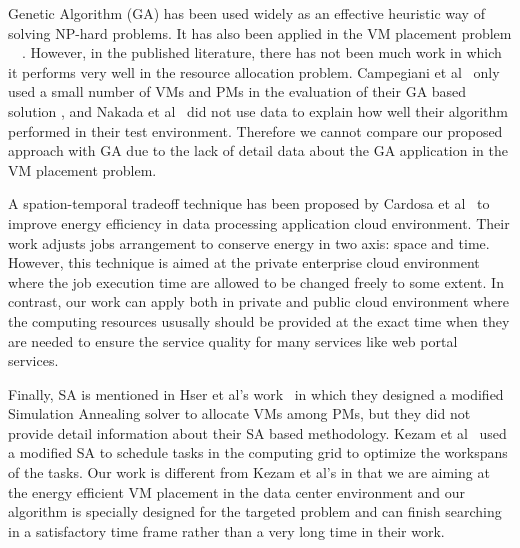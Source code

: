 \documentclass[10pt, conference, compsocconf]{IEEEtran}
\begin{document}
Genetic Algorithm (GA) has been used widely as an effective heuristic way of
solving NP-hard problems. It has also been applied in the VM placement problem
~\cite{nakada09}~\cite{campegiani09}.
However, in the published literature, there has not been much work in which it
performs very well in the resource allocation problem. Campegiani et
al~\cite{campegiani09} only used a small number of VMs and PMs in the evaluation
of their GA based solution , and Nakada et al~\cite{nakada09} did not use data to explain how well their
algorithm performed in their test environment. Therefore we cannot compare our proposed approach
with GA due to the lack of detail data about the GA application in the VM
placement problem.

A spation-temporal tradeoff technique has been proposed by Cardosa et
al~\cite{cardosa11} to improve energy efficiency in data processing application
cloud environment.
Their work adjusts jobs arrangement to conserve energy in two axis: space and
time. However, this technique is aimed at the private enterprise cloud
environment where the job execution time are allowed to be changed freely to
some extent.
In contrast, our work can apply both in private and public cloud environment
where the computing resources ususally should be provided at the exact time when
they are needed to ensure the service quality for many services like web portal
services.

Finally, SA is mentioned in Hser et al's work~\cite{hyser07} in which they designed a modified
Simulation Annealing solver to allocate VMs among PMs, but they did not provide
detail information about their SA based methodology. Kezam et al~\cite{kazem08}
used a modified SA to schedule tasks in the computing grid to optimize the
workspans of the tasks. Our work is different from Kezam et al's in that we are
aiming at the energy efficient VM placement in the data center environment and
our algorithm is specially designed for the targeted problem and can finish searching in a
 satisfactory time frame rather than a very long time in their work.
\end{document}
